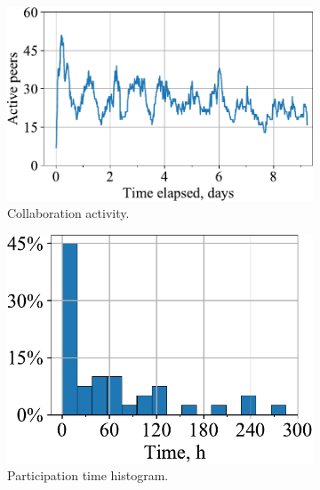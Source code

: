 \begin{figure}[b]
\vspace{-14pt}
\noindent
\centering
\begin{subfigure}[t]{0.37\textwidth}
\centering
\includegraphics[width=\textwidth]{resources/peer_activity.pdf}
\caption{Collaboration activity.}
\label{fig:activity}
\end{subfigure}
\begin{subfigure}[t]{0.3\textwidth}
\centering
\includegraphics[width=\textwidth]{resources/contrib_hist.pdf}
\caption{Participation time histogram.}
\label{fig:contrib}
\end{subfigure}
\begin{subfigure}[t]{0.3\textwidth}
\centering

\end{subfigure}
\end{figure}
